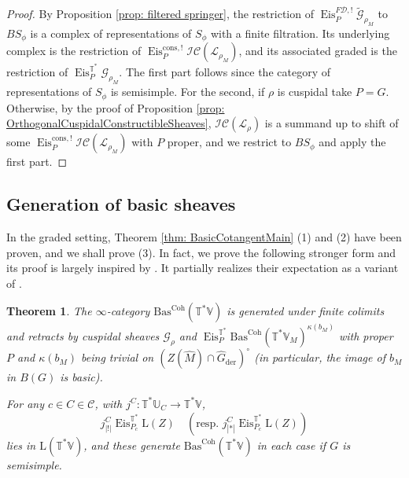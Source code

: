 \documentclass{amsart}
\newtheorem{theorem}{Theorem}[subsection]
\theoremstyle{definition}
\theoremstyle{remark}
\numberwithin{equation}{section}
\newcommand{\U}{\mathbb{U}}
\newcommand{\der}{\mathrm{der}}
\newcommand{\mc}{\mathcal}
\newcommand{\wh}{\widehat}
\DeclareMathOperator{\Eis}{\mathrm{Eis}}
\newcommand{\Coh}{\mathrm{Coh}}
\newcommand{\V}{\mathbb{V}}
\newcommand{\T}{\mathbb{T}}
\newcommand{\Bas}{\mathrm{Bas}}
\newcommand{\ush}{\lvert ! \rvert}
\newcommand{\mrL}{\mathrm{L}}
\begin{document}
\begin{proof}
By Proposition \ref{prop: filtered springer}, the restriction of $\Eis_{P}^{F\mc D, !} \widetilde{\mc G}_{\rho_M}$ to $BS_\phi$ is a complex of representations of $S_\phi$ with a finite filtration. Its underlying complex is the restriction of $\Eis_{P}^{\mathrm{cons}, !} \mc{IC}(\mc L_{\rho_M})$, and its associated graded is the restriction of $\Eis^{\T^*}_P \mc G_{\rho_M}$. The first part follows since the category of representations of $S_\phi$ is semisimple. For the second, if $\rho$ is cuspidal take $P=G$. Otherwise, by the proof of Proposition \ref{prop: OrthogonalCuspidalConstructibleSheaves}, $\mc{IC}(\mc L_\rho)$ is a summand up to shift of some $\Eis_{P}^{\mathrm{cons}, !} \mc{IC}(\mc L_{\rho_M})$ with $P$ proper, and we restrict to $BS_\phi$ and apply the first part. 
\end{proof}

\subsection{Generation of basic sheaves}{\label{ss: basgen}}
In the graded setting, Theorem \ref{thm: BasicCotangentMain} (1) and (2) have been proven, and we shall prove (3). In fact, we prove the following stronger form and its proof is largely inspired by \cite[\S6.3]{PTDolbeault}. It partially realizes their expectation \cite[footnote 8, Conjecture 6.4]{PTDolbeault} as a variant of \cite[Theorem 6.13]{PTDolbeault}. 

\begin{theorem}\label{thm: cotanbasgenbycuspeis}
The $\infty$-category $\Bas^\Coh(\T^*\V)$ is generated under finite colimits and retracts by cuspidal sheaves $\mc G_\rho$ and 
$\Eis_P^{\T^*} \Bas^\Coh(\T^*\V_M)^{\kappa(b_M)}$ with proper $P$ and $\kappa (b_M)$ being trivial on $(Z(\wh M) \cap \wh{G}_\der)^\circ$ (in particular, the image of $b_M$ in $B(G)$ is basic). 

For any $c \in C\in \mc C$, with $j^C\colon \T^*\U_C\to \T^* \V$,
\[
j^{C}_{\ush}\Eis_{P_c}^{\T^*}\mrL(Z) \quad (\text{resp.~}j^{C}_{|\ast|} \Eis_{P_c}^{\T^*}\mrL(Z))
\]
lies in $\mrL(\T^*\V)$, and these generate $\Bas^\Coh(\T^*\V)$ in each case if $G$ is semisimple.
\end{theorem}
\end{document}
